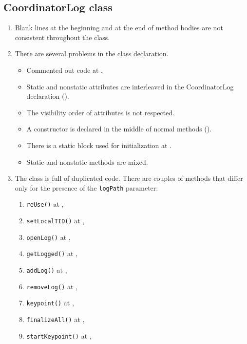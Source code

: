 \subsection{CoordinatorLog class}
\label{sec:coordinatorlog-class}
\begin{enumerate}
    \item {} Blank lines at the beginning and at the end of method bodies are not consistent throughout the class.
    \item {} There are several problems in the class declaration.
    \begin{itemize}
        \item  Commented out code at .
        \item Static and nonstatic attributes are interleaved in the CoordinatorLog declaration ().
        \item The visibility order of attributes is not respected.
        \item A constructor is declared in the middle of normal methods ().
        \item There is a static block used for initialization at .
        \item Static and nonstatic methods are mixed.
    \end{itemize}

    \item {} The class is full of duplicated code. There are couples of methods that differ only for the presence of the \texttt{logPath} parameter:
    \begin{enumerate}
        \item \texttt{reUse()} at , 
    	\item \texttt{setLocalTID()} at , 
    	\item \texttt{openLog()} at , 
    	\item \texttt{getLogged()} at , 
    	\item \texttt{addLog()} at , 
    	\item \texttt{removeLog()} at , 
    	\item \texttt{keypoint()} at , 
    	\item \texttt{finalizeAll()} at , 
    	\item \texttt{startKeypoint()} at , 
    \end{enumerate}
\end{enumerate}
